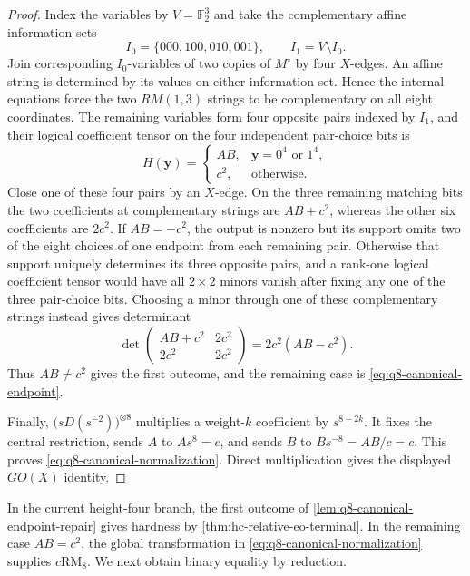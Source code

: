 \documentclass[11pt,letterpaper,onecolumn]{article}
\theoremstyle{plain}
\theoremstyle{definition}
\theoremstyle{remark}
\newcommand{\Ftwo}{\mathbb F_2}
\newcommand{\RMcore}{\mathrm{RM}_8}
\begin{document}
	\begin{proof}
		Index the variables by \(V=\Ftwo^3\) and take the complementary affine
		information sets
		\[
		I_0=\{000,100,010,001\},
		\qquad
		I_1=V\setminus I_0.
		\]
		Join corresponding \(I_0\)-variables of two copies of \(M^\circ\) by four
		\(X\)-edges.  An affine string is determined by its values on either
		information set.  Hence the internal equations force the two
		\(RM(1,3)\) strings to be complementary on all eight coordinates.  The
		remaining variables form four opposite pairs indexed by \(I_1\), and their
		logical coefficient tensor on the four independent pair-choice bits is
		\[
		H({\mathbf y})=
		\begin{cases}
			AB,&{\mathbf y}=0^4\text{ or }1^4,\\
			c^2,&\text{otherwise}.
		\end{cases}
		\]
		Close one of these four pairs by an \(X\)-edge.  On the three
		remaining matching bits the two coefficients at complementary strings are \(AB+c^2\),
		whereas the other six coefficients are \(2c^2\).  If \(AB=-c^2\), the
		output is nonzero but its support omits two of the eight choices of one
		endpoint from each remaining pair.  Otherwise that
		support uniquely determines its three opposite pairs, and a rank-one
		logical coefficient tensor would have all \(2\times2\) minors vanish after fixing
		any one of the three pair-choice bits.  Choosing a minor through one of these complementary strings instead gives determinant
		\[
		\det\begin{pmatrix}
			AB+c^2&2c^2\\
			2c^2&2c^2
		\end{pmatrix}
		=2c^2(AB-c^2).
		\]
		Thus \(AB\ne c^2\) gives the first outcome, and the remaining case is
		\eqref{eq:q8-canonical-endpoint}.
		
		Finally, \(\bigl(sD(s^{-2})\bigr)^{\otimes8}\) multiplies a weight-\(k\) coefficient by
		\(s^{8-2k}\).  It fixes the central restriction, sends \(A\) to \(As^8=c\),
		and sends \(B\) to \(Bs^{-8}=AB/c=c\).  This proves
		\eqref{eq:q8-canonical-normalization}. Direct multiplication gives the
		displayed \(GO(X)\) identity.
	\end{proof}

In the current height-four branch, the first outcome of
\cref{lem:q8-canonical-endpoint-repair} gives hardness by
\cref{thm:hc-relative-eo-terminal}. In the remaining case \(AB=c^2\),
the global transformation in \cref{eq:q8-canonical-normalization} supplies
\(c\RMcore\). We next obtain binary equality by reduction.
\end{document}
